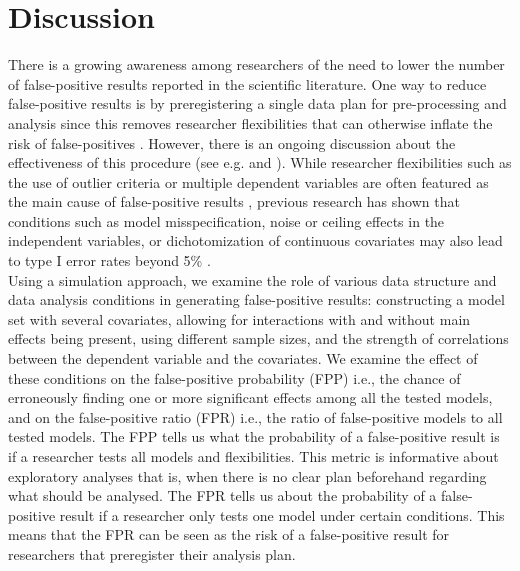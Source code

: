\section{Discussion}
There is a growing awareness among researchers of the need to lower the number of false-positive results reported in the scientific literature. One way to reduce false-positive results is by preregistering a single data plan for pre-processing and analysis since this removes researcher flexibilities that can otherwise inflate the risk of false-positives \citep{simmons2018}. However, there is an ongoing discussion about the effectiveness of this procedure (see e.g. \cite{Pham2020} and \cite{Simmons2020}). While researcher flexibilities such as the use of outlier criteria or multiple dependent variables are often featured as the main cause of false-positive results \citep{John2012}, previous research has shown that conditions such as model misspecification, noise or ceiling effects in the independent variables, or dichotomization of continuous covariates may also lead to type I error rates beyond 5\% \citep{Dennis2019, Litiere2007, Brunner2009, Austin2003, Austin2004}. \\

Using a simulation approach, we examine the role of various data structure and data analysis conditions in generating false-positive results: constructing a model set with several covariates, allowing for interactions with and without main effects being present, using different sample sizes, and the strength of correlations between the dependent variable and the covariates. We examine the effect of these conditions on the false-positive probability (FPP) i.e., the chance of erroneously finding one or more significant effects among all the tested models, and on the false-positive ratio (FPR) i.e., the ratio of  false-positive models to all tested models. The FPP tells us what the probability of a false-positive result is if a researcher tests all models and flexibilities. This metric is informative about exploratory analyses that is, when there is no clear plan beforehand regarding what should be analysed. The FPR tells us about the probability of a false-positive result if a researcher only tests one model under certain conditions. This means that the FPR can be seen as the risk of a false-positive result for researchers that preregister their analysis plan. \\


